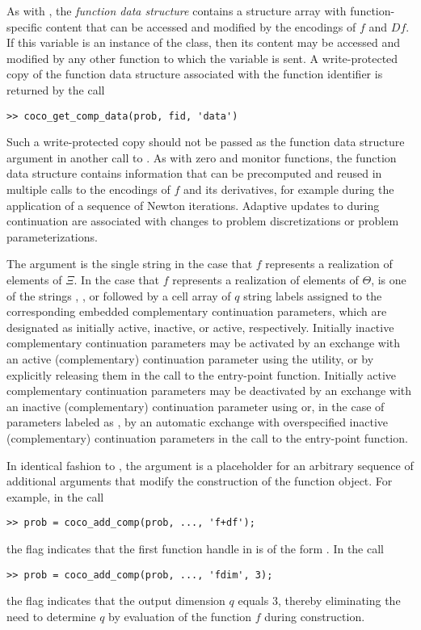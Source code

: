 As with , the \emph{function data structure}  contains a structure array with function-specific content that can be accessed and modified by the encodings of $f$ and $Df$. If this variable is an instance of the  class, then its content may be accessed and modified by any other function to which the variable is sent. A write-protected copy of the function data structure associated with the function identifier  is returned by the call
\begin{lstlisting}[language=coco-highlight]
>> coco_get_comp_data(prob, fid, 'data')
\end{lstlisting}
Such a write-protected copy should not be passed as the function data structure argument in another call to . As with zero and monitor functions, the function data structure contains information that can be precomputed and reused in multiple calls to the encodings of $f$ and its derivatives, for example during the application of a sequence of Newton iterations. Adaptive updates to  during continuation are associated with changes to problem discretizations or problem parameterizations.

The argument  is the single string  in the case that $f$ represents a realization of elements of $\Xi$. In the case that $f$ represents a realization of elements of $\Theta$,  is one of the strings , , or  followed by a cell array of $q$ string labels assigned to the corresponding embedded complementary continuation parameters, which are designated as initially active, inactive, or active, respectively. Initially inactive complementary continuation parameters may be activated by an exchange with an active (complementary) continuation parameter using the  utility, or by explicitly releasing them in the call to the  entry-point function. Initially active complementary continuation parameters may be deactivated by an exchange with an inactive (complementary) continuation parameter using  or, in the case of parameters labeled as , by an automatic exchange with overspecified inactive (complementary) continuation parameters in the call to the  entry-point function. 

In identical fashion to , the argument  is a placeholder for an arbitrary sequence of additional arguments that modify the construction of the function object. For example, in the call
\begin{lstlisting}[language=coco-highlight]
>> prob = coco_add_comp(prob, ..., 'f+df');
\end{lstlisting}
the flag  indicates that the first function handle in  is of the form . In the call
\begin{lstlisting}[language=coco-highlight]
>> prob = coco_add_comp(prob, ..., 'fdim', 3);
\end{lstlisting}
the flag  indicates that the output dimension $q$ equals $3$, thereby eliminating the need to determine $q$ by evaluation of the function $f$ during construction.

